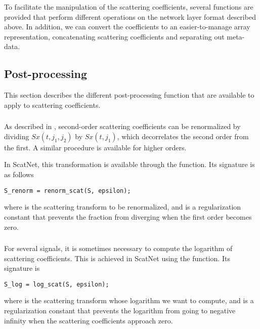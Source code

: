 \documentclass[twocolumn]{article}
\begin{document}
To facilitate the manipulation of the scattering coefficients, several functions are provided that perform different operations on the network layer format described above. In addition, we can convert the coefficients to an easier-to-manage array representation, concatenating scattering coefficients and separating out meta-data.

\subsection{Post-processing}

This section describes the different post-processing function that are available to apply to scattering coefficients.

\subsubsection{}
As described in \cite{joakim}, second-order scattering coefficients can be renormalized by dividing $Sx(t,j_1,j_2)$ by $Sx(t,j_1)$, which decorrelates the second order from the first. A similar procedure is available for higher orders.

In ScatNet, this transformation is available through the  function. Its signature is as follows
\begin{lstlisting}
S_renorm = renorm_scat(S, epsilon);
\end{lstlisting}
where  is the scattering transform to be renormalized, and  is a regularization constant that prevents the fraction from diverging when the first order becomes zero.

\subsubsection{}
For several signals, it is sometimes necessary to compute the logarithm of scattering coefficients. This is achieved in ScatNet using the  function. Its signature is
\begin{lstlisting}
S_log = log_scat(S, epsilon);
\end{lstlisting}
where  is the scattering transform whose logarithm we want to compute, and  is a regularization constant that prevents the logarithm from going to negative infinity when the scattering coefficients approach zero.

\subsubsection{}
\end{document}
